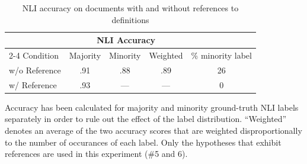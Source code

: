 \begin{table}[t]
    \centering
    \begin{threeparttable}
        \centering
        \fontsize{8pt}{10pt}\selectfont
        \setlength{\tabcolsep}{3pt}
        \renewcommand{\arraystretch}{.6}
        \begin{tabular}{lcccc}\toprule
            & \multicolumn{3}{c}{NLI Accuracy} & \\\cmidrule{2-4}
            Condition & Majority & Minority & Weighted & \% minority label \\\midrule
            w/o Reference & .91 & .88 & .89 & 26 \\
            w/ Reference & .93 &  --- & --- & 0 \\
            \bottomrule
        \end{tabular}
        \makeatletter\def\TPT@hsize{}\makeatletter
        \begin{tablenotes}
            \raggedright
            \fontsize{7pt}{7pt}\selectfont
            Accuracy has been calculated for majority and minority ground-truth NLI labels separately in order to rule out the effect of the label distribution. ``Weighted'' denotes an average of the two accuracy scores that are weighted disproportionally to the number of occurances of each label. Only the hypotheses that exhibit references are used in this experiment (\#5 and 6).
        \end{tablenotes}
    \end{threeparttable}
    \caption{NLI accuracy on documents with and without references to definitions}\label{tab:experiment-reference}
\end{table}
